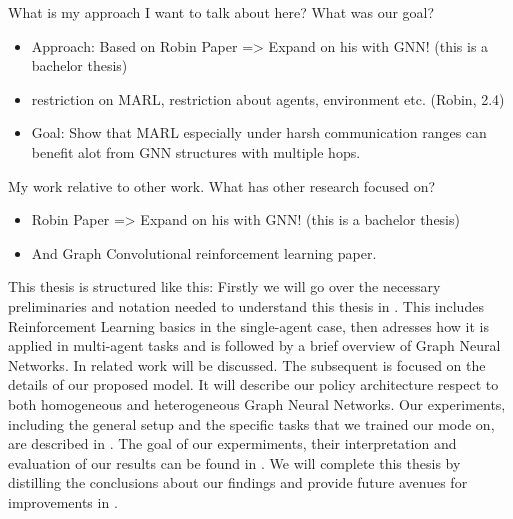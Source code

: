 What is my approach I want to talk about here? What was our goal?
\begin{itemize}[noitemsep,nolistsep]
	\item Approach: Based on Robin Paper => Expand on his with GNN! (this is a bachelor thesis) \citet{RobinRuede2021}
	\item restriction on MARL, restriction about agents, environment etc. (Robin, 2.4)
	\item Goal: Show that MARL especially under harsh communication ranges can benefit alot from GNN structures with multiple hops.
\end{itemize} \par

My work relative to other work. What has other research focused on?
\begin{itemize}[noitemsep,nolistsep]
	\item Robin Paper => Expand on his with GNN! (this is a bachelor thesis) \citet{RobinRuede2021}
	\item And Graph Convolutional reinforcement learning paper.
\end{itemize} \par

This thesis is structured like this: Firstly we will go over the necessary preliminaries and notation needed to understand this thesis in . This includes Reinforcement Learning basics in the single-agent case, then adresses how it is applied in multi-agent tasks and is followed by a brief overview of Graph Neural Networks. In  related work will be discussed. The subsequent  is focused on the details of our proposed model. It will describe our policy architecture respect to both homogeneous and heterogeneous Graph Neural Networks. Our experiments, including the general setup and the specific tasks that we trained our mode on, are described in . The goal of our expermiments, their interpretation and evaluation of our results can be found in . We will complete this thesis by distilling the conclusions about our findings and provide future avenues for improvements in . 